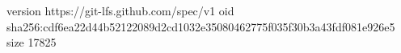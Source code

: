 version https://git-lfs.github.com/spec/v1
oid sha256:cdf6ea22d44b52122089d2cd1032e35080462775f035f30b3a43fdf081e926e5
size 17825
